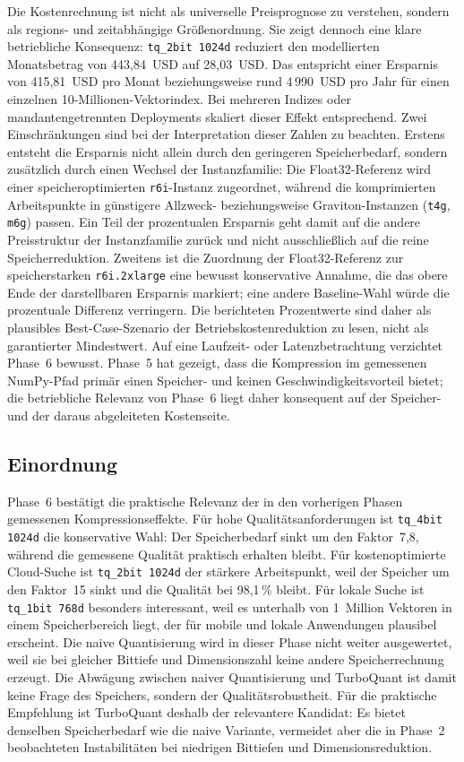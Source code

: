 %
Die Kostenrechnung ist nicht als universelle Preisprognose zu verstehen, sondern als regions- und zeitabhängige Größenordnung.
Sie zeigt dennoch eine klare betriebliche Konsequenz: \texttt{tq\_2bit 1024d} reduziert den modellierten Monatsbetrag von 443{,}84~USD auf 28{,}03~USD.
Das entspricht einer Ersparnis von 415{,}81~USD pro Monat beziehungsweise rund 4\,990~USD pro Jahr für einen einzelnen 10-Millionen-Vektorindex.
Bei mehreren Indizes oder mandantengetrennten Deployments skaliert dieser Effekt entsprechend.
%
Zwei Einschränkungen sind bei der Interpretation dieser Zahlen zu beachten.
Erstens entsteht die Ersparnis nicht allein durch den geringeren Speicherbedarf, sondern zusätzlich durch einen Wechsel der Instanzfamilie: Die Float32-Referenz wird einer speicheroptimierten \texttt{r6i}-Instanz zugeordnet, während die komprimierten Arbeitspunkte in günstigere Allzweck- beziehungsweise Graviton-Instanzen (\texttt{t4g}, \texttt{m6g}) passen.
Ein Teil der prozentualen Ersparnis geht damit auf die andere Preisstruktur der Instanzfamilie zurück und nicht ausschließlich auf die reine Speicherreduktion.
Zweitens ist die Zuordnung der Float32-Referenz zur speicherstarken \texttt{r6i.2xlarge} eine bewusst konservative Annahme, die das obere Ende der darstellbaren Ersparnis markiert; eine andere Baseline-Wahl würde die prozentuale Differenz verringern.
Die berichteten Prozentwerte sind daher als plausibles Best-Case-Szenario der Betriebskostenreduktion zu lesen, nicht als garantierter Mindestwert.
%
Auf eine Laufzeit- oder Latenzbetrachtung verzichtet Phase~6 bewusst.
Phase~5 hat gezeigt, dass die Kompression im gemessenen NumPy-Pfad primär einen Speicher- und keinen Geschwindigkeitsvorteil bietet; die betriebliche Relevanz von Phase~6 liegt daher konsequent auf der Speicher- und der daraus abgeleiteten Kostenseite.
%
\subsection{Einordnung}
%
Phase~6 bestätigt die praktische Relevanz der in den vorherigen Phasen gemessenen Kompressionseffekte.
Für hohe Qualitätsanforderungen ist \texttt{tq\_4bit 1024d} die konservative Wahl: Der Speicherbedarf sinkt um den Faktor~7{,}8, während die gemessene Qualität praktisch erhalten bleibt.
Für kostenoptimierte Cloud-Suche ist \texttt{tq\_2bit 1024d} der stärkere Arbeitspunkt, weil der Speicher um den Faktor~15 sinkt und die Qualität bei 98{,}1\,\% bleibt.
Für lokale Suche ist \texttt{tq\_1bit 768d} besonders interessant, weil es unterhalb von 1~Million Vektoren in einem Speicherbereich liegt, der für mobile und lokale Anwendungen plausibel erscheint.
%
Die naive Quantisierung wird in dieser Phase nicht weiter ausgewertet, weil sie bei gleicher Bittiefe und Dimensionszahl keine andere Speicherrechnung erzeugt.
Die Abwägung zwischen naiver Quantisierung und TurboQuant ist damit keine Frage des Speichers, sondern der Qualitätsrobustheit.
Für die praktische Empfehlung ist TurboQuant deshalb der relevantere Kandidat: Es bietet denselben Speicherbedarf wie die naive Variante, vermeidet aber die in Phase~2 beobachteten Instabilitäten bei niedrigen Bittiefen und Dimensionsreduktion.
%
